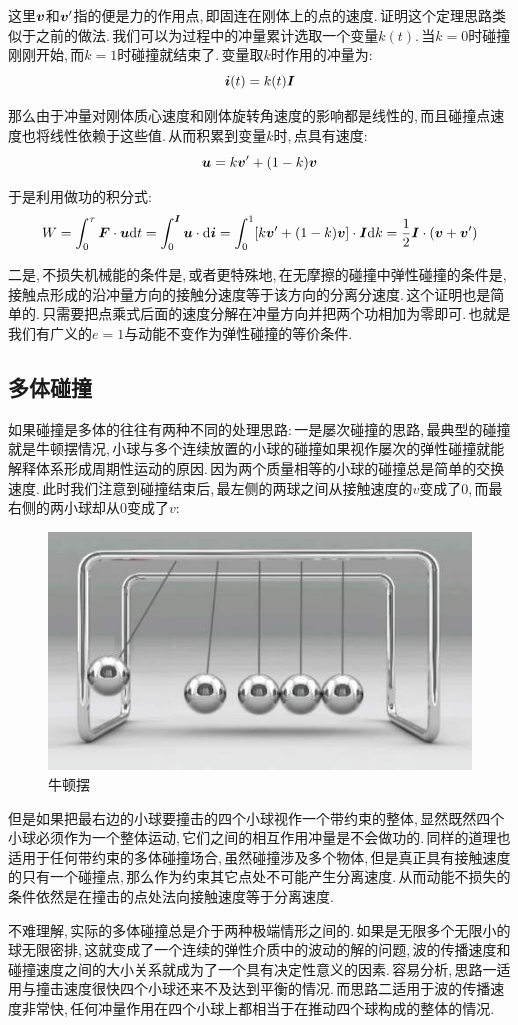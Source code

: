 这里$\boldsymbol{v}$和$\boldsymbol{v}'$指的便是力的作用点,\,即固连在刚体上的点的速度.\,证明这个定理思路类似于之前的做法.\,我们可以为过程中的冲量累计选取一个变量$k(t)$.\,当$k=0$时碰撞刚刚开始,\,而$k=1$时碰撞就结束了.\,变量取$k$时作用的冲量为:
\[\boldsymbol{i}(t)=k(t)\boldsymbol{I}\]

那么由于冲量对刚体质心速度和刚体旋转角速度的影响都是线性的,\,而且碰撞点速度也将线性依赖于这些值.\,从而积累到变量$k$时,\,点具有速度:
\[\boldsymbol{u}=k\boldsymbol{v}'+(1-k)\boldsymbol{v}\]

于是利用做功的积分式:
\[W=\int_0^\tau \boldsymbol{F}\cdot \boldsymbol{u}\textrm{d} t=\int_0^{\boldsymbol{I}} \boldsymbol{u}\cdot \textrm{d} \boldsymbol{i}=\int_0^1[k\boldsymbol{v}'+(1-k)\boldsymbol{v}]\cdot\boldsymbol{I}\textrm{d} k=\frac{1}{2}\boldsymbol{I}\cdot(\boldsymbol{v}+\boldsymbol{v}')\]

二是,\,不损失机械能的条件是,\,或者更特殊地,\,在无摩擦的碰撞中弹性碰撞的条件是,\,接触点形成的沿冲量方向的接触分速度等于该方向的分离分速度.\,这个证明也是简单的.\,只需要把点乘式后面的速度分解在冲量方向并把两个功相加为零即可.\,也就是我们有广义的$e=1$与动能不变作为弹性碰撞的等价条件.


\subsection{多体碰撞}
如果碰撞是多体的往往有两种不同的处理思路:\,一是屡次碰撞的思路,\,最典型的碰撞就是牛顿摆情况,\,小球与多个连续放置的小球的碰撞如果视作屡次的弹性碰撞就能解释体系形成周期性运动的原因.\,因为两个质量相等的小球的碰撞总是简单的交换速度.\,此时我们注意到碰撞结束后,\,最左侧的两球之间从接触速度的$v$变成了$0$,\,而最右侧的两小球却从$0$变成了$v$:
\begin{figure}[H]
\centering
\includegraphics[width=16cm]{image/6-1-14}
\caption{牛顿摆}
\end{figure}

但是如果把最右边的小球要撞击的四个小球视作一个带约束的整体,\,显然既然四个小球必须作为一个整体运动,\,它们之间的相互作用冲量是不会做功的.\,同样的道理也适用于任何带约束的多体碰撞场合,\,虽然碰撞涉及多个物体,\,但是真正具有接触速度的只有一个碰撞点,\,那么作为约束其它点处不可能产生分离速度.\,从而动能不损失的条件依然是在撞击的点处法向接触速度等于分离速度.

不难理解,\,实际的多体碰撞总是介于两种极端情形之间的.\,如果是无限多个无限小的球无限密排,\,这就变成了一个连续的弹性介质中的波动的解的问题,\,波的传播速度和碰撞速度之间的大小关系就成为了一个具有决定性意义的因素.\,容易分析,\,思路一适用与撞击速度很快四个小球还来不及达到平衡的情况.\,而思路二适用于波的传播速度非常快,\,任何冲量作用在四个小球上都相当于在推动四个球构成的整体的情况.